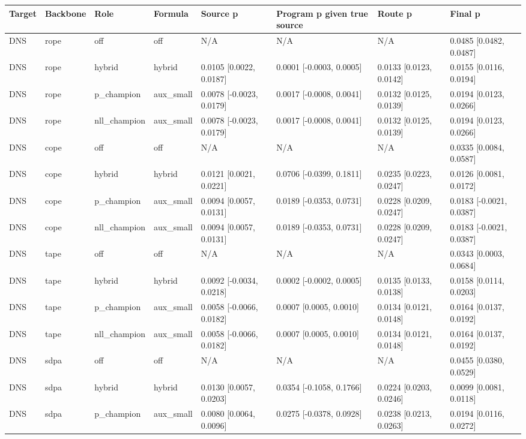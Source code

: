 \begin{tabular}{llllllll}
\hline
Target & Backbone & Role & Formula & Source p & Program p given true source & Route p & Final p \\
\hline
DNS & rope & off & off & N/A & N/A & N/A & 0.0485 [0.0482, 0.0487] \\
DNS & rope & hybrid & hybrid & 0.0105 [0.0022, 0.0187] & 0.0001 [-0.0003, 0.0005] & 0.0133 [0.0123, 0.0142] & 0.0155 [0.0116, 0.0194] \\
DNS & rope & p\_champion & aux\_small & 0.0078 [-0.0023, 0.0179] & 0.0017 [-0.0008, 0.0041] & 0.0132 [0.0125, 0.0139] & 0.0194 [0.0123, 0.0266] \\
DNS & rope & nll\_champion & aux\_small & 0.0078 [-0.0023, 0.0179] & 0.0017 [-0.0008, 0.0041] & 0.0132 [0.0125, 0.0139] & 0.0194 [0.0123, 0.0266] \\
DNS & cope & off & off & N/A & N/A & N/A & 0.0335 [0.0084, 0.0587] \\
DNS & cope & hybrid & hybrid & 0.0121 [0.0021, 0.0221] & 0.0706 [-0.0399, 0.1811] & 0.0235 [0.0223, 0.0247] & 0.0126 [0.0081, 0.0172] \\
DNS & cope & p\_champion & aux\_small & 0.0094 [0.0057, 0.0131] & 0.0189 [-0.0353, 0.0731] & 0.0228 [0.0209, 0.0247] & 0.0183 [-0.0021, 0.0387] \\
DNS & cope & nll\_champion & aux\_small & 0.0094 [0.0057, 0.0131] & 0.0189 [-0.0353, 0.0731] & 0.0228 [0.0209, 0.0247] & 0.0183 [-0.0021, 0.0387] \\
DNS & tape & off & off & N/A & N/A & N/A & 0.0343 [0.0003, 0.0684] \\
DNS & tape & hybrid & hybrid & 0.0092 [-0.0034, 0.0218] & 0.0002 [-0.0002, 0.0005] & 0.0135 [0.0133, 0.0138] & 0.0158 [0.0114, 0.0203] \\
DNS & tape & p\_champion & aux\_small & 0.0058 [-0.0066, 0.0182] & 0.0007 [0.0005, 0.0010] & 0.0134 [0.0121, 0.0148] & 0.0164 [0.0137, 0.0192] \\
DNS & tape & nll\_champion & aux\_small & 0.0058 [-0.0066, 0.0182] & 0.0007 [0.0005, 0.0010] & 0.0134 [0.0121, 0.0148] & 0.0164 [0.0137, 0.0192] \\
DNS & sdpa & off & off & N/A & N/A & N/A & 0.0455 [0.0380, 0.0529] \\
DNS & sdpa & hybrid & hybrid & 0.0130 [0.0057, 0.0203] & 0.0354 [-0.1058, 0.1766] & 0.0224 [0.0203, 0.0246] & 0.0099 [0.0081, 0.0118] \\
DNS & sdpa & p\_champion & aux\_small & 0.0080 [0.0064, 0.0096] & 0.0275 [-0.0378, 0.0928] & 0.0238 [0.0213, 0.0263] & 0.0194 [0.0116, 0.0272] \\

\end{tabular}
